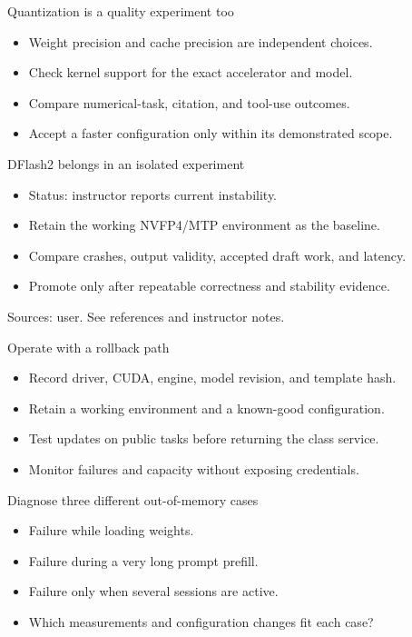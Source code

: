 \documentclass[aspectratio=169,11pt]{beamer}
\begin{document}
\begin{frame}[t,fragile]{Quantization is a quality experiment too}
\fontsize{11.5}{14}\selectfont
\begin{itemize}\setlength{\itemsep}{2mm}
\item Weight precision and cache precision are independent choices.
\item Check kernel support for the exact accelerator and model.
\item Compare numerical-task, citation, and tool-use outcomes.
\item Accept a faster configuration only within its demonstrated scope.
\end{itemize}
\end{frame}
\begin{frame}[t,fragile]{DFlash2 belongs in an isolated experiment}
\fontsize{11.5}{14}\selectfont
\begin{itemize}\setlength{\itemsep}{2mm}
\item Status: instructor reports current instability.
\item Retain the working NVFP4/MTP environment as the baseline.
\item Compare crashes, output validity, accepted draft work, and latency.
\item Promote only after repeatable correctness and stability evidence.
\end{itemize}
\vfill{\fontsize{6.5}{8}\selectfont\color{UTgray} Sources: user. See references and instructor notes.\par}
\end{frame}
\begin{frame}[t,fragile]{Operate with a rollback path}
\fontsize{11.5}{14}\selectfont
\begin{itemize}\setlength{\itemsep}{2mm}
\item Record driver, CUDA, engine, model revision, and template hash.
\item Retain a working environment and a known-good configuration.
\item Test updates on public tasks before returning the class service.
\item Monitor failures and capacity without exposing credentials.
\end{itemize}
\end{frame}
\begin{frame}[t,fragile]{Diagnose three different out-of-memory cases}
\fontsize{11.5}{14}\selectfont
\begin{itemize}\setlength{\itemsep}{2mm}
\item Failure while loading weights.
\item Failure during a very long prompt prefill.
\item Failure only when several sessions are active.
\item Which measurements and configuration changes fit each case?
\end{itemize}
\end{frame}
\end{document}
